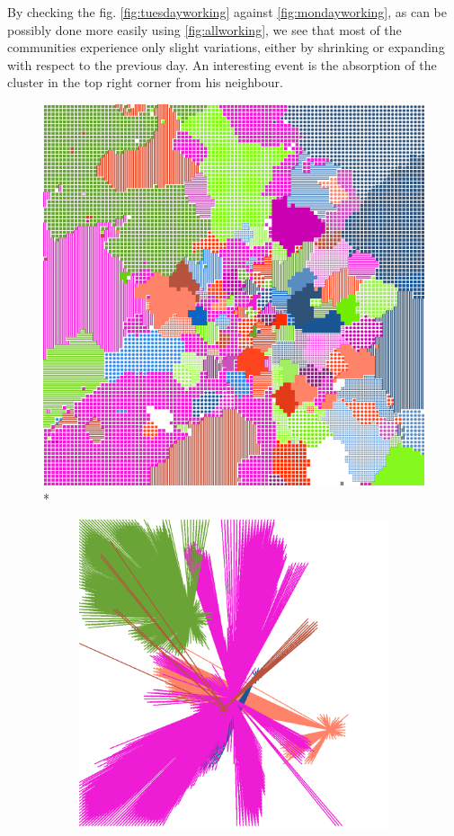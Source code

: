 \documentclass[12pt,a4paper]{article}
\begin{document}
By checking the fig. \ref{fig:tuesdayworking} against \ref{fig:mondayworking}, as can be possibly done more easily using \ref{fig:allworking},
we see that most of the communities experience only slight variations, either by shrinking or expanding with respect to the previous day.
An interesting event is the absorption of the cluster in the top right corner from his neighbour.
\begin{figure}[H]
\centering
\includegraphics[width=0.8\linewidth]{weekDef/2Tue.png}
\\*
\begin{subfigure}[b]{0.3\textwidth}
\includegraphics[width=\textwidth]{weekDef/edges-2Tue-big.png}

\end{subfigure}
\end{figure}
\end{document}
